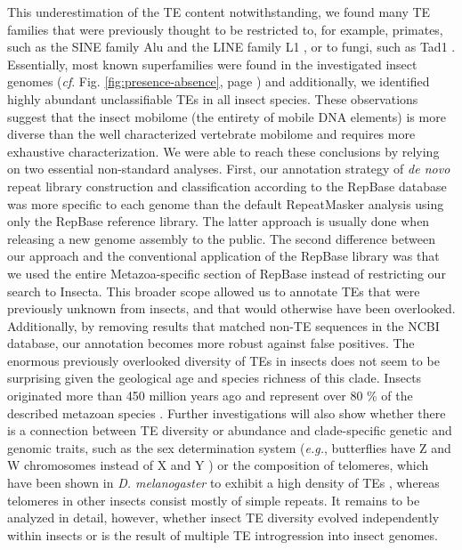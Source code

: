 This underestimation of the TE content notwithstanding, we found many TE
families that were previously thought to be restricted to, for example,
primates, such as the SINE family Alu \citep{Kriegs2007} and the LINE
family L1 \citep{Liu2003}, or to fungi, such as Tad1
\citep{Cambareri1994}. Essentially, most known superfamilies were found in
the investigated insect genomes (\emph{cf}. Fig.
\ref{fig:presence-absence}, page \pageref{fig:presence-absence}) and
additionally, we identified highly abundant unclassifiable TEs in all
insect species.  These observations suggest that the insect mobilome
(the entirety of mobile DNA elements) is more diverse than the well
characterized vertebrate mobilome \citep{Chalopin2015} and requires more
exhaustive characterization. We were able to reach these conclusions by
relying on two essential non-standard analyses. First, our annotation
strategy of \emph{de novo} repeat library construction and
classification according to the RepBase database was more specific to
each genome than the default RepeatMasker analysis using only the
RepBase reference library.  The latter approach is usually done when
releasing a new genome assembly to the public. The second difference
between our approach and the conventional application of the RepBase
library was that we used the entire Metazoa-specific section of RepBase
instead of restricting our search to Insecta. This broader scope allowed
us to annotate TEs that were previously unknown from insects, and that
would otherwise have been overlooked. Additionally, by removing results
that matched non-TE sequences in the NCBI database, our annotation
becomes more robust against false positives. The enormous previously
overlooked diversity of TEs in insects does not seem to be surprising
given the geological age and species richness of this clade. Insects
originated more than 450 million years ago \citep{Misof2014} and
represent over 80 \% of the described metazoan species
\citep{Grimaldi2005}. Further investigations will also show whether
there is a connection between TE diversity or abundance and
clade-specific genetic and genomic traits, such as the sex determination
system (\emph{e.g.}, butterflies have Z and W chromosomes instead of X
and Y \citep{Traut1997}) or the composition of telomeres, which have
been shown in \emph{D. melanogaster} to exhibit a high density of TEs
\citep{Levis1993}, whereas telomeres in other insects consist mostly of
simple repeats. It remains to be analyzed in detail, however, whether
insect TE diversity evolved independently within insects or is the
result of multiple TE introgression into insect genomes.

